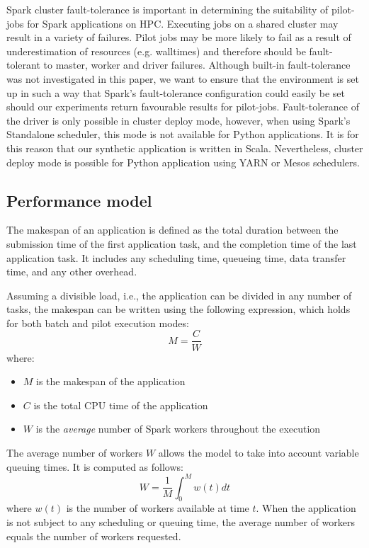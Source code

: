 \documentclass{IEEEtran}
\begin{document}
    Spark cluster fault-tolerance is important in determining the suitability of
    pilot-jobs for Spark applications on HPC. Executing jobs on a shared cluster may
    result in a variety of failures. Pilot jobs may be more likely to fail as a result of
    underestimation of resources (e.g. walltimes) and therefore should be fault-tolerant
    to master, worker and driver failures. Although built-in fault-tolerance was not
    investigated in this paper, we want to ensure that the environment is set up in such
    a way that Spark's fault-tolerance configuration could easily be set should our 
    experiments return favourable results for pilot-jobs.
    Fault-tolerance of the driver is only possible in cluster deploy mode, however,
    when using Spark's Standalone scheduler, this mode is not available for Python 
    applications. It is for this reason that our synthetic application is written
    in Scala. Nevertheless, cluster deploy mode is possible for Python application
    using YARN or Mesos schedulers.


    \subsection{Performance model}

    The makespan of an application is defined as the total duration
    between the submission time of the first application task, and the
    completion time of the last application task. It includes any
    scheduling time, queueing time, data transfer time, and any other
    overhead.
    
    Assuming a divisible load, i.e., the application can be divided in any
    number of tasks, the makespan can be written using the following
    expression, which holds for both batch and pilot execution modes:
    \begin{equation}
        M = \frac{C}{W} \label{eq:mcw}
    \end{equation}
    where:
    \begin{itemize}
        \item $M$ is the makespan of the application
        \item $C$ is the total CPU time of the application
        \item $W$ is the \emph{average} number of Spark workers throughout the execution
    \end{itemize}
    The average number of workers $W$ allows the model to take into account
     variable queuing times. It is computed as follows:
    \begin{equation}
        W = \frac{1}{M}\int_0^M{w(t)dt}\label{eq:avgw}
    \end{equation}
    where $w(t)$ is the number of workers available at time $t$. When the
    application is not subject to any scheduling or queuing time, the
    average number of workers equals the number of workers requested. 
\end{document}
